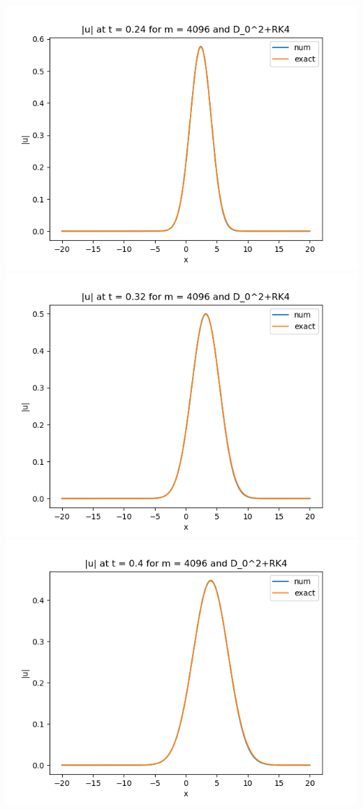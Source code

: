 \documentclass{article}
\begin{document}
\begin{enumerate}[label=(\alph*)]
\begin{center}
\end{center}
\begin{center}
	\includegraphics[scale=.3]{FINAL u_abs t = 0.24 m = 4096 D02+RK4}
	\includegraphics[scale=.3]{FINAL u_abs t = 0.32 m = 4096 D02+RK4}
	\includegraphics[scale=.3]{FINAL u_abs t = 0.4 m = 4096 D02+RK4}

\end{center}
\end{enumerate}
\end{document}
